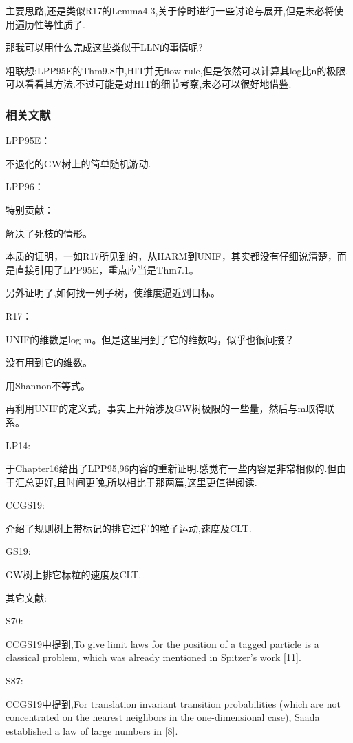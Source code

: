				主要思路,还是类似R17的Lemma4.3,关于停时进行一些讨论与展开,但是未必将使用遍历性等性质了.

				那我可以用什么完成这些类似于LLN的事情呢?

				粗联想:LPP95E的Thm9.8中,HIT并无flow rule,但是依然可以计算其log比n的极限.可以看看其方法.不过可能是对HIT的细节考察,未必可以很好地借鉴.

	
			\subsubsection*{相关文献}

				\qquad LPP95E\cite{LPP95E}：

					不退化的GW树上的简单随机游动.

				\qquad LPP96\cite{LPP96B}：

					特别贡献：

					解决了死枝的情形。

					本质的证明，一如R17所见到的，从HARM到UNIF，其实都没有仔细说清楚，而是直接引用了LPP95E，重点应当是Thm7.1。

					另外证明了,如何找一列子树，使维度逼近到目标。

				\qquad R17\cite{R17}：
					
					UNIF的维数是log m。但是这里用到了它的维数吗，似乎也很间接？

					没有用到它的维数。

					用Shannon不等式。

					再利用UNIF的定义式，事实上开始涉及GW树极限的一些量，然后与m取得联系。

				\qquad LP14\cite{LP14}:

					于Chapter16给出了LPP95,96内容的重新证明.感觉有一些内容是非常相似的.但由于汇总更好,且时间更晚,所以相比于那两篇,这里更值得阅读.

				\qquad CCGS19\cite{CCGS19}:

					介绍了规则树上带标记的排它过程的粒子运动,速度及CLT.

				\qquad GS19\cite{GS19}:

					GW树上排它标粒的速度及CLT.

				其它文献:

				S70:

					CCGS19中提到,To give limit laws for the position of a tagged particle is a classical problem, which was already mentioned in Spitzer’s work [11].

				S87:

					CCGS19中提到,For translation invariant transition probabilities (which are not concentrated on the nearest neighbors in the one-dimensional case), Saada established a law of large numbers in [8].

